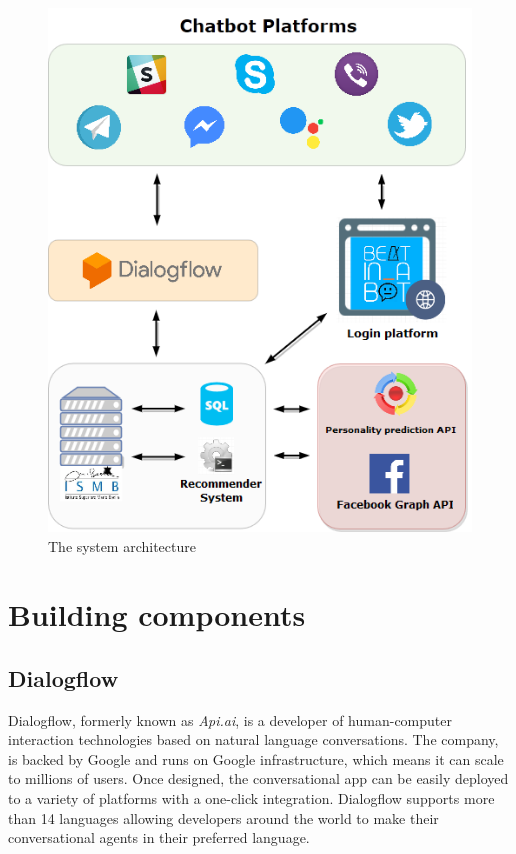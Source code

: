 \documentclass[b5paper,10pt,twoside,cucitura]{toptesi}
\begin{document}
\begin{figure}[h]
\centering
\includegraphics[scale=0.39]{architecture.png}
\caption{The system architecture}
\end{figure}

\section{Building components}

\subsection{Dialogflow}
Dialogflow, formerly known as \textit{Api.ai}, is a developer of human-computer interaction technologies based on natural language conversations. The company, is backed by Google and runs on Google infrastructure, which means it can scale to millions of users. Once designed, the conversational app can be easily deployed to a variety of platforms with a one-click integration. Dialogflow supports more than 14 languages allowing developers around the world to make their conversational agents in their preferred language. 
\end{document}
